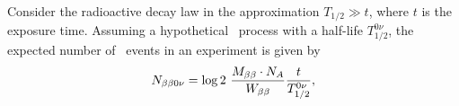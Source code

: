 
Consider the radioactive decay law in the approximation $T_{1/2}\gg t$, where $t$ is the exposure time. Assuming a hypothetical \bbonu\ process with a half-life $T_{1/2}^{0\nu}$, the expected number of \bbonu\ events in an experiment is given by
%
\begin{equation}
N_{\beta\beta0\nu} = \log 2 \ \frac{M_{\beta\beta}\cdot N_{A}}{W_{\beta\beta}}  \frac{t}{T_{1/2}^{0\nu}}, 
\label{eq:Nbb}
\end{equation}
%
